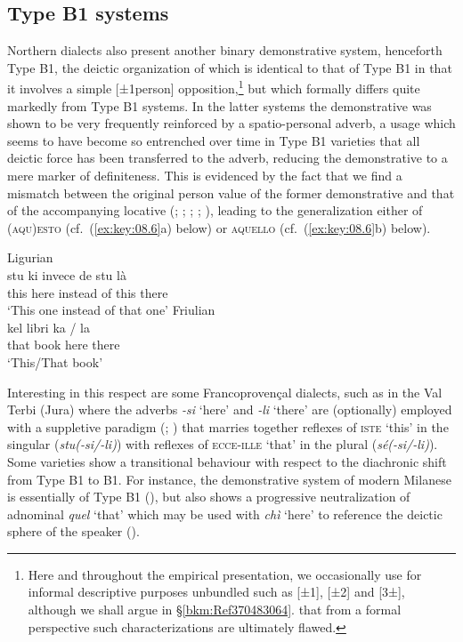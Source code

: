 \documentclass[output=paper]{langsci/langscibook}
\begin{document}
\subsection{Type B1 systems}\label{bkm:Ref370487849}

Northern  dialects also present another binary demonstrative sys\-tem,
henceforth Type B1, the deictic organization of which is identical to
that of Type B1 in that it involves a simple [±1person]
opposition,\footnote{Here and throughout the empirical presentation, we
    occasionally use for informal descriptive purposes unbundled 
    such as [±1], [±2] and [3±], although we shall argue in
    §\ref{bkm:Ref370483064}. that from a formal perspective such characterizations
are ultimately flawed.} but which formally differs quite markedly from Type
B1 systems. In the latter systems the demonstrative was shown to be very
frequently reinforced by a spatio-personal adverb, a usage which seems to have
become so entrenched over time in Type B1 varieties that all deictic
force has been transferred to the adverb, reducing the demonstrative to a mere
marker of definiteness. This is evidenced by the fact that we find a mismatch
between the original person value of the former demonstrative and that of the
accompanying locative (\citealt[21]{Berruto:1974a};
\citealt[171]{Azaretti:1982a}; \citealt[241]{Parry:1997a};
\citealt[112f]{Vanelli:1997a}; \citealt[107--110]{Irsara:2009a}), leading to
the generalization either of (\textsc{aqu)esto} (cf.\ (\ref{ex:key:08.6}a)
below) or \textsc{aquello} (cf.\ (\ref{ex:key:08.6}b) below).

\ea\label{ex:key:08.6}
\ea\label{bkm:Ref370498429}Ligurian \citep{Azaretti:1982a}\\
\gll     stu  ki  invece  de  stu  là\\
this  here  instead  of  this  there\\
\glt \enquote*{This one instead of that one}
\ex Friulian \citep{Vanelli:1997a}\\
\gll  kel  libri  ka  /  la\\
that  book  here {} there\\
\glt \enquote*{This/That book}
\z
\z

Interesting in this respect are some Francoprovençal dialects, such as in the
Val Terbi (Jura) where the adverbs \emph{-si} ‘here’ and
\emph{-li} ‘there’ are (optionally) employed with a suppletive
paradigm (\citealt{Kjellman:1928a}; \citealt[85]{Butz:1981a}) that marries
together reflexes of \textsc{iste} ‘this’ in the singular (\emph{stu(-si/-li)})
with reflexes of \textsc{ecce-ille} ‘that’ in the plural (\emph{sé(-si/-li)}).
Some varieties show a transitional behaviour with respect to the diachronic
shift from Type B1 to B1. For instance, the demonstrative system
of modern Milanese is essentially of Type B1
(\citealt[79]{Ledgeway:2015a}), but also shows a progressive neutralization of
adnominal \emph{quel} ‘that’ which may be used with \emph{chì} ‘here’ to
reference the deictic sphere of the speaker (\citealt[108f]{Irsara:2009a}).
\end{document}
